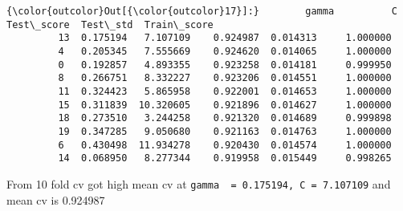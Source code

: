 \documentclass[11pt]{article}
\begin{document}
\begin{Verbatim}[commandchars=\\\{\}]
{\color{outcolor}Out[{\color{outcolor}17}]:}        gamma          C  Test\_score  Test\_std  Train\_score
         13  0.175194   7.107109    0.924987  0.014313     1.000000
         4   0.205345   7.555669    0.924620  0.014065     1.000000
         0   0.192857   4.893355    0.923258  0.014181     0.999950
         8   0.266751   8.332227    0.923206  0.014551     1.000000
         11  0.324423   5.865958    0.922001  0.014653     1.000000
         15  0.311839  10.320605    0.921896  0.014627     1.000000
         18  0.273510   3.244258    0.921320  0.014689     0.999898
         19  0.347285   9.050680    0.921163  0.014763     1.000000
         6   0.430498  11.934278    0.920430  0.014574     1.000000
         14  0.068950   8.277344    0.919958  0.015449     0.998265
\end{Verbatim}
            
    From 10 fold cv got high mean cv at
\texttt{gamma\ \ =\ 0.175194,\ C\ =\ 7.107109} and mean cv is 0.924987
\end{document}
